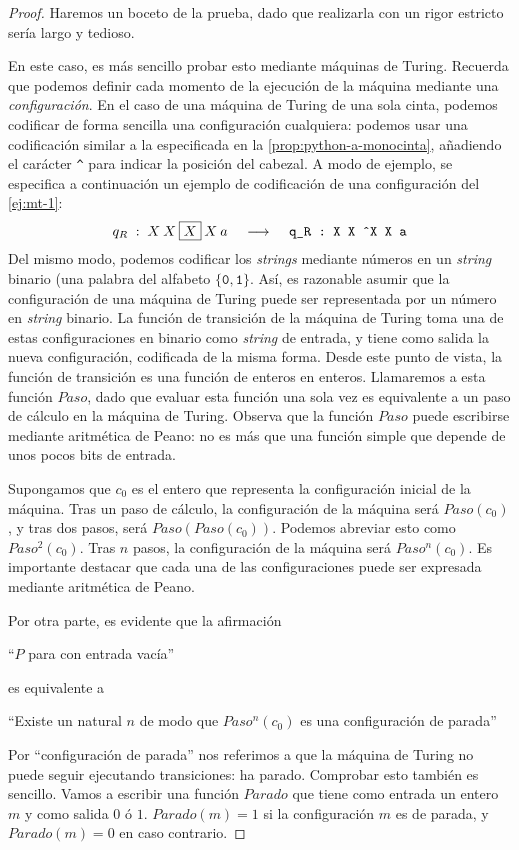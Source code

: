 \begin{proof}
Haremos un boceto de la prueba, dado que realizarla con un rigor estricto sería largo y tedioso.

En este caso, es más sencillo probar esto mediante máquinas de Turing. Recuerda que podemos definir cada momento de la ejecución de la máquina mediante una \emph{configuración}. En el caso de una máquina de Turing de una sola cinta, podemos codificar de forma sencilla una configuración cualquiera: podemos usar una codificación similar a la especificada en la \cref{prop:python-a-monocinta}, añadiendo el carácter \texttt{\^{}} para indicar la posición del cabezal. A modo de ejemplo, se especifica a continuación un ejemplo de codificación de una configuración del \cref{ej:mt-1}:
$$
q_R\;:\;X\:X\:\fbox{$X$}\:X\:a \;\;\;\; \longrightarrow \;\;\;\; \texttt{q\_R : X X \^{}X X a}
$$
Del mismo modo, podemos codificar los \emph{strings} mediante números en un \emph{string} binario (una palabra del alfabeto $\{\texttt{0}, \texttt{1}\}$. Así, es razonable asumir que la configuración de una máquina de Turing puede ser representada por un número en \emph{string} binario. La función de transición de la máquina de Turing toma una de estas configuraciones en binario como \emph{string} de entrada, y tiene como salida la nueva configuración, codificada de la misma forma. Desde este punto de vista, la función de transición es una función de enteros en enteros. Llamaremos a esta función $Paso$, dado que evaluar esta función una sola vez es equivalente a un paso de cálculo en la máquina de Turing. Observa que la función $Paso$ puede escribirse mediante aritmética de Peano: no es más que una función simple que depende de unos pocos bits de entrada.

Supongamos que $c_0$ es el entero que representa la configuración inicial de la máquina. Tras un paso de cálculo, la configuración de la máquina será $Paso(c_0)$, y tras dos pasos, será $Paso(Paso(c_0))$. Podemos abreviar esto como $Paso^2(c_0)$. Tras $n$ pasos, la configuración de la máquina será $Paso^n(c_0)$. Es importante destacar que cada una de las configuraciones puede ser expresada mediante aritmética de Peano.

Por otra parte, es evidente que la afirmación
\begin{adjustwidth}{30pt}{}
    ``$P$ para con entrada vacía''
\end{adjustwidth}
es equivalente a
\begin{adjustwidth}{30pt}{}
    ``Existe un natural $n$ de modo que $Paso^n(c_0)$ es una configuración de parada''
\end{adjustwidth}
Por ``configuración de parada'' nos referimos a que la máquina de Turing no puede seguir ejecutando transiciones: ha parado. Comprobar esto también es sencillo. Vamos a escribir una función $Parado$ que tiene como entrada un entero $m$ y como salida $0$ ó $1$. $Parado(m)=1$ si la configuración $m$ es de parada, y $Parado(m)=0$ en caso contrario.


\end{proof}
